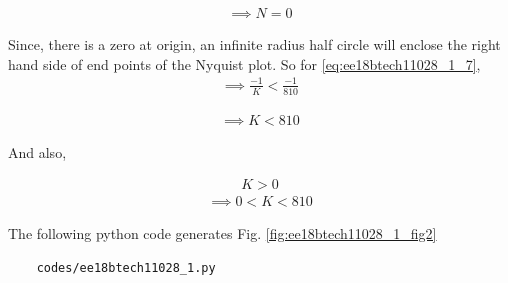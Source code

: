 \begin{enumerate}[label=\thesection.\arabic*.,ref=\thesection.\theenumi]
\begin{align}
    \implies N = 0
    \label{eq:ee18btech11028_1_7}
\end{align}




Since, there is a zero at origin, an infinite radius half circle will enclose the right hand side of end points of the Nyquist plot.
So for \ref{eq:ee18btech11028_1_7},
\begin{align}
    \implies \frac{-1}{K} < \frac{-1}{810}
\end{align}

\begin{align}
    \implies K < 810
\end{align}

And also,

\begin{align}
    K > 0
\end{align}
\begin{align}
    \implies 0 < K < 810     
\end{align}


The following python code generates  Fig. \ref{fig:ee18btech11028_1_fig2}
\begin{lstlisting}
    codes/ee18btech11028_1.py
\end{lstlisting}
\end{enumerate}